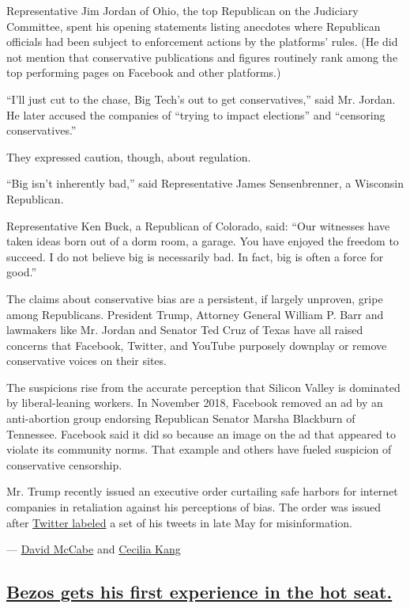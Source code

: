 Representative Jim Jordan of Ohio, the top Republican on the Judiciary
Committee, spent his opening statements listing anecdotes where
Republican officials had been subject to enforcement actions by the
platforms' rules. (He did not mention that conservative publications and
figures routinely rank among the top performing pages on Facebook and
other platforms.)

``I'll just cut to the chase, Big Tech's out to get conservatives,''
said Mr. Jordan. He later accused the companies of ``trying to impact
elections'' and ``censoring conservatives.''

They expressed caution, though, about regulation.

``Big isn't inherently bad,'' said Representative James Sensenbrenner, a
Wisconsin Republican.

Representative Ken Buck, a Republican of Colorado, said: ``Our witnesses
have taken ideas born out of a dorm room, a garage. You have enjoyed the
freedom to succeed. I do not believe big is necessarily bad. In fact,
big is often a force for good.''

The claims about conservative bias are a persistent, if largely
unproven, gripe among Republicans. President Trump, Attorney General
William P. Barr and lawmakers like Mr. Jordan and Senator Ted Cruz of
Texas have all raised concerns that Facebook, Twitter, and YouTube
purposely downplay or remove conservative voices on their sites.

The suspicions rise from the accurate perception that Silicon Valley is
dominated by liberal-leaning workers. In November 2018, Facebook removed
an ad by an anti-abortion group endorsing Republican Senator Marsha
Blackburn of Tennessee. Facebook said it did so because an image on the
ad that appeared to violate its community norms. That example and others
have fueled suspicion of conservative censorship.

Mr. Trump recently issued an executive order curtailing safe harbors for
internet companies in retaliation against his perceptions of bias. The
order was issued after
\href{https://slack-redir.net/link?url=https\%3A\%2F\%2Fwww.nytimes.com\%2F2020\%2F05\%2F26\%2Ftechnology\%2Ftwitter-trump-mail-in-ballots.html}{Twitter
labeled} a set of his tweets in late May for misinformation.

--- \href{https://www.nytimes.com/by/david-mccabe}{David McCabe} and
\href{https://www.nytimes.com/by/cecilia-kang}{Cecilia Kang}

\hypertarget{bezos-gets-his-first-experience-in-the-hot-seat}{%
\subsection{\texorpdfstring{\protect\hyperlink{bezos-gets-his-first-experience-in-the-hot-seat}{Bezos
gets his first experience in the hot
seat.}}{Bezos gets his first experience in the hot seat.}}\label{bezos-gets-his-first-experience-in-the-hot-seat}}

